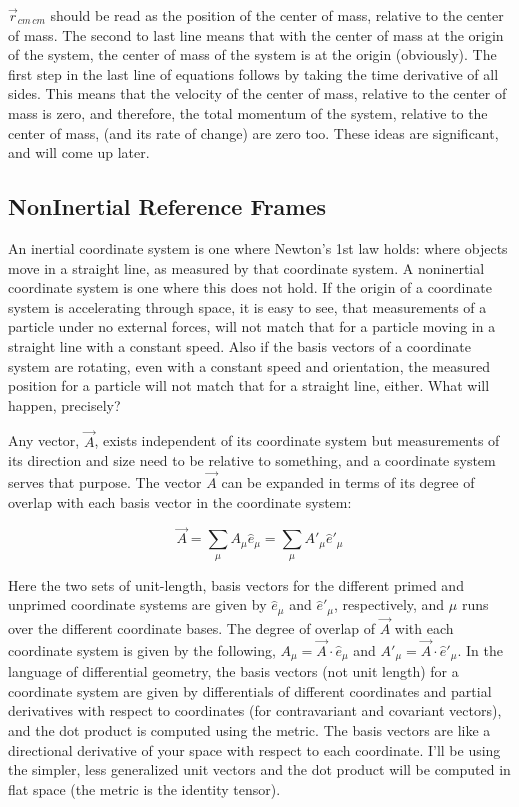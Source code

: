 \documentclass[10pt]{article}
\begin{document}
\begin{itemize}
    $\vec{r}_{cm\,cm}$ should be read as the position of the 
    center of mass, relative to the center of mass. 
    The second to last line means that with the center of mass at the 
    origin of the system, the center of mass of the system is at the origin 
    (obviously). The first step in the 
    last line of equations follows by taking the time 
    derivative of all sides. This means that the velocity of the 
    center of mass, relative to the center of mass is zero, and therefore, 
    the total momentum of the system, relative to the center of mass, 
    (and its rate of change) are zero too. 
    These ideas are significant, and will come up later. 
    
\end{itemize}

\subsection{NonInertial Reference Frames}

An inertial coordinate system is one where Newton's 1st law holds: 
where objects move in a straight line, as measured by that coordinate system.
A noninertial coordinate system is one where this does not hold. If the 
origin of a coordinate system is accelerating through space, 
it is easy to see, that 
measurements of a particle under no external forces, will not match that for 
a particle moving in a straight line with a constant speed. Also if the 
basis vectors of a coordinate system are rotating, even with a constant 
speed and orientation, the measured position for a particle will not match 
that for a straight line, either. What will happen, precisely?

Any vector, $\vec{A}$, exists independent of its coordinate system 
but measurements of its direction and size need to be relative to something, 
and a coordinate system serves that purpose. The vector $\vec{A}$ can be 
expanded in terms of its degree of overlap with each basis vector in the 
coordinate system:

\begin{equation}
    \vec{A} = \sum_\mu A_\mu \hat{e}_\mu = \sum_\mu A'_\mu\hat{e}'_\mu
\end{equation}

Here the two sets of unit-length,
basis vectors for the different primed and unprimed 
coordinate systems are given by $\hat{e}_\mu$ and $\hat{e}'_\mu$, respectively,
and $\mu$ runs over the different coordinate bases. 
The degree of overlap of $\vec{A}$ with each coordinate system is given 
by the following, $A_\mu = \vec{A}\cdot\hat{e}_\mu$ and 
$A'_\mu = \vec{A}\cdot\hat{e}'_\mu$. In 
the language of differential geometry, 
the basis vectors (not unit length) for a coordinate system 
are given by differentials of different coordinates 
and partial derivatives with respect to coordinates (for 
contravariant and covariant vectors), and the dot product is computed 
using the metric. The basis vectors are like a directional derivative of your 
space with respect to each coordinate.
I'll be using the simpler, less generalized unit vectors 
and the dot product will be computed in flat space (the metric is the identity
tensor). 
\end{document}
